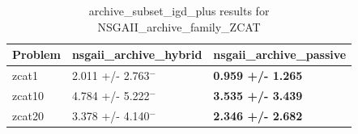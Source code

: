 \begin{table}
\caption{archive_subset_igd_plus results for NSGAII_archive_family_ZCAT}
\label{NSGAII_archive_family_ZCAT_archive_subset_igd_plus}
\begin{tabular}{lll}
\toprule
Problem & nsgaii_archive_hybrid & nsgaii_archive_passive \\
\midrule
zcat1 & 2.011 +/- 2.763$^{-}$ & \textbf{0.959 +/- 1.265} \\
zcat10 & 4.784 +/- 5.222$^{-}$ & \textbf{3.535 +/- 3.439} \\
zcat20 & 3.378 +/- 4.140$^{-}$ & \textbf{2.346 +/- 2.682} \\
\bottomrule
\end{tabular}
\end{table}
